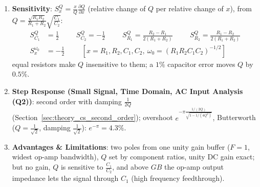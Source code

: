 \begin{enumerate}
    \paragraph{At Input:} \(s \to 0\): \(Z_{in} \to \infty\) (no DC path to ground); \(s \to \infty\): \(C_1\), \(C_2\)
    short \(V_x\) to \(V_{out}\) and \(V_y\) to ground, \(Z_{in} \to R_1\).
    \paragraph{At Output:} the buffer output, \(Z_{out} = \frac{R_o}{1 + A} \approx 0\) (Section~\ref{sec:amp_buffer}).
  \item \textbf{Sensitivity}: \(S_x^Q = \frac{x}{Q}\frac{\partial Q}{\partial x}\) (relative change of \(Q\) per relative change of \(x\)),
    from \(Q = \frac{\sqrt{R_1R_2}}{R_1 + R_2}\sqrt{\frac{C_1}{C_2}}\):
    \begin{align*}
      S_{C_1}^Q &= \frac{1}{2} \hspace{1cm} S_{C_2}^Q = -\frac{1}{2} \hspace{1cm} S_{R_1}^Q = \frac{R_2 - R_1}{2(R_1 + R_2)} \hspace{1cm} S_{R_2}^Q = \frac{R_1 - R_2}{2(R_1 + R_2)} \\
      S_x^{\omega_0} &= -\frac{1}{2} \hspace{1cm} [x = R_1, R_2, C_1, C_2,\ \omega_0 = (R_1R_2C_1C_2)^{-1/2}]
    \end{align*}
    equal resistors make \(Q\) insensitive to them; a \(1\%\) capacitor error moves \(Q\) by \(0.5\%\).
  \item \textbf{Step Response (Small Signal, Time Domain, AC Input Analysis (Q2))}: second order with damping
    \(\frac{1}{2Q}\) (Section~\ref{sec:theory_cs_second_order}); overshoot \(e^{-\pi\frac{1/(2Q)}{\sqrt{1 - 1/(4Q^2)}}}\), Butterworth
    (\(Q = \frac{1}{\sqrt{2}}\), damping \(\frac{1}{\sqrt{2}}\)): \(e^{-\pi} = 4.3\%\).
  \item \textbf{Advantages \& Limitations}: two poles from one unity gain buffer (\(F = 1\), widest
    op-amp bandwidth), \(Q\) set by component ratios, unity DC gain exact; but no gain, \(Q\) is
    sensitive to \(\frac{C_1}{C_2}\), and above \(GB\) the op-amp output impedance lets the signal through
    \(C_1\) (high frequency feedthrough).
\end{enumerate}

